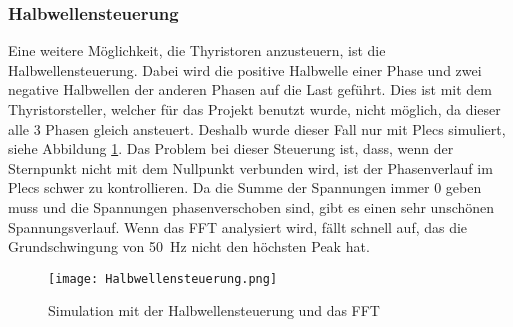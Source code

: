 \newpage
\subsubsection*{Halbwellensteuerung}
Eine weitere Möglichkeit, die Thyristoren anzusteuern, ist die Halbwellensteuerung. Dabei wird die positive Halbwelle einer Phase und zwei negative Halbwellen der anderen Phasen auf die Last geführt. Dies ist mit dem Thyristorsteller, welcher für das Projekt benutzt wurde, nicht möglich, da dieser alle 3 Phasen gleich ansteuert. Deshalb wurde dieser Fall nur mit Plecs simuliert, siehe Abbildung \ref{fig:HalbwellensteuerungT}. Das Problem bei dieser Steuerung ist, dass, wenn der Sternpunkt nicht mit dem Nullpunkt verbunden wird, ist der Phasenverlauf im Plecs schwer zu kontrollieren. Da die Summe der Spannungen immer 0 geben muss und die Spannungen phasenverschoben sind, gibt es einen sehr unschönen Spannungsverlauf. Wenn das FFT analysiert wird, fällt schnell auf, das die Grundschwingung von \SI{50}{Hz} nicht den höchsten Peak hat.

\begin{figure}[ht!]
	\centering
	\texttt{[image: Halbwellensteuerung.png]}
	\caption{Simulation mit der Halbwellensteuerung und das FFT}
	\label{fig:HalbwellensteuerungT}
\end{figure}

